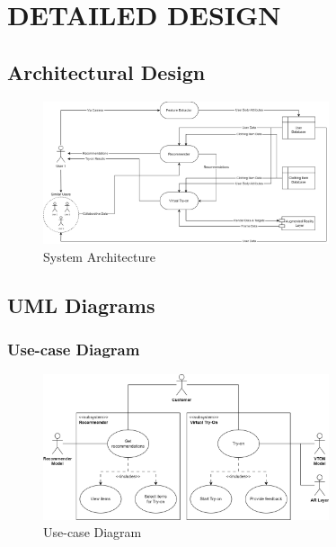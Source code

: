 \chapter{DETAILED DESIGN}

\section{Architectural Design}
	\begin{figure}[h!]
		\centering
		\includegraphics[width=0.75\textwidth]{components/images/sys-arch.png}
		\caption{System Architecture}
		\label{fig:sys-arch}
	\end{figure}

\section{UML Diagrams}
	\subsection{Use-case Diagram}
		\begin{figure}[h!]
			\centering
			\includegraphics[width=0.75\textwidth]{components/images/use-case.png}
			\caption{Use-case Diagram}
			\label{fig:use-case-rep}
		\end{figure}

	\pagebreak

